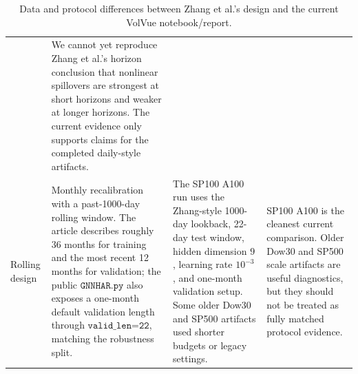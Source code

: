 \documentclass[11pt]{article}
\begin{document}
\begin{table}[H]
\begin{tabular}{
>{\raggedright\arraybackslash}p{}
>{\raggedright\arraybackslash}p{}
>{\raggedright\arraybackslash}p{}
>{\raggedright\arraybackslash}p{}}
& We cannot yet reproduce Zhang et al.'s horizon conclusion that nonlinear spillovers are strongest at short horizons and weaker at longer horizons.  The current evidence only supports claims for the completed daily-style artifacts. \\
\addlinespace
Rolling design
& Monthly recalibration with a past-1000-day rolling window.  The article describes roughly 36 months for training and the most recent 12 months for validation; the public \(\texttt{GNNHAR.py}\) also exposes a one-month default validation length through \(\texttt{valid\_len=22}\), matching the robustness split.
& The SP100 A100 run uses the Zhang-style 1000-day lookback, 22-day test window, hidden dimension \(9\), learning rate \(10^{-3}\), and one-month validation setup.  Some older Dow30 and SP500 artifacts used shorter budgets or legacy settings.
& SP100 A100 is the cleanest current comparison.  Older Dow30 and SP500 scale artifacts are useful diagnostics, but they should not be treated as fully matched protocol evidence. \\
\bottomrule
\end{tabular}
\caption{Data and protocol differences between Zhang et al.'s design and the current VolVue notebook/report.}
\label{tab:zhang-data-differences}
\end{table}
\end{document}
